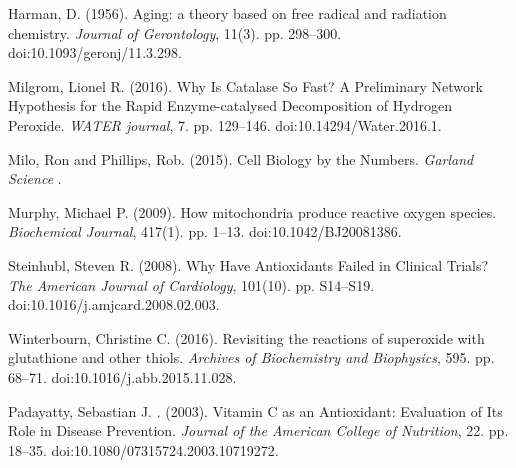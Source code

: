 \documentclass[preprint,12pt,authoryear]{elsarticle}
\begin{document}
\begin{thebibliography}{00}
{Harman, D}.
(1956).
Aging: a theory based on free radical and radiation chemistry.
{\em Journal of Gerontology},  11(3).
pp. {298--300}.
doi:10.1093/geronj/11.3.298.

Milgrom, Lionel R.
(2016).
Why Is Catalase So Fast? A Preliminary Network Hypothesis for the Rapid Enzyme-catalysed Decomposition of Hydrogen Peroxide.
{\em WATER journal}, 7.
pp. 129--146.
doi:10.14294/Water.2016.1.

Milo, Ron and Phillips, Rob.
(2015).
Cell Biology by the Numbers.
{\em Garland Science }.

Murphy, Michael P.
(2009).
How mitochondria produce reactive oxygen species.
{ \em Biochemical Journal},  417(1).
pp. {1--13}.
doi:10.1042/BJ20081386.

Steinhubl, Steven R.
(2008).
Why Have Antioxidants Failed in Clinical Trials?
{\em The American Journal of Cardiology},  101(10).
pp. S14--S19.
doi:10.1016/j.amjcard.2008.02.003.


Winterbourn, Christine C.
(2016).
Revisiting the reactions of superoxide with glutathione and other thiols.
{ \em Archives of Biochemistry and Biophysics},  595.
pp. {68--71}.
doi:10.1016/j.abb.2015.11.028.

Padayatty, Sebastian J. .
(2003).
Vitamin C as an Antioxidant: Evaluation of Its Role in Disease Prevention.
{ \em Journal of the American College of Nutrition},  22.
pp. {18--35}.
doi:10.1080/07315724.2003.10719272.
%
\end{thebibliography}
\end{document}
